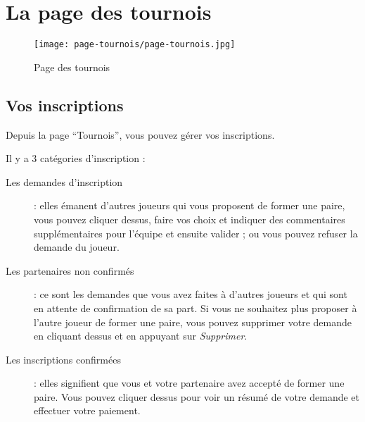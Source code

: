 \section{La page des tournois}

\begin{figure}[H]
\centering
\texttt{[image: page-tournois/page-tournois.jpg]}
\caption{Page des tournois}
\end{figure}

\subsection{Vos inscriptions}

Depuis la page \enquote{Tournois}, vous pouvez gérer vos inscriptions. \newline

Il y a 3 catégories d'inscription : \newline

\begin{description}
    \item[Les demandes d'inscription] : elles émanent d'autres joueurs qui
    vous proposent de former une paire, vous pouvez cliquer dessus, faire vos
    choix et indiquer des commentaires supplémentaires pour l'équipe et ensuite
    valider ; ou vous pouvez refuser la demande du joueur.
    \item[Les partenaires non confirmés] : ce sont les demandes que vous avez
    faites à d'autres joueurs et qui sont en attente de confirmation de sa part.
    Si vous ne souhaitez plus proposer à l'autre joueur de former une paire,
    vous pouvez supprimer votre demande en cliquant dessus et en appuyant sur
    \textit{Supprimer}.
    \item[Les inscriptions confirmées] : elles signifient que vous et votre
    partenaire avez accepté de former une paire. Vous pouvez cliquer dessus
    pour voir un résumé de votre demande et effectuer votre paiement.
\end{description}
